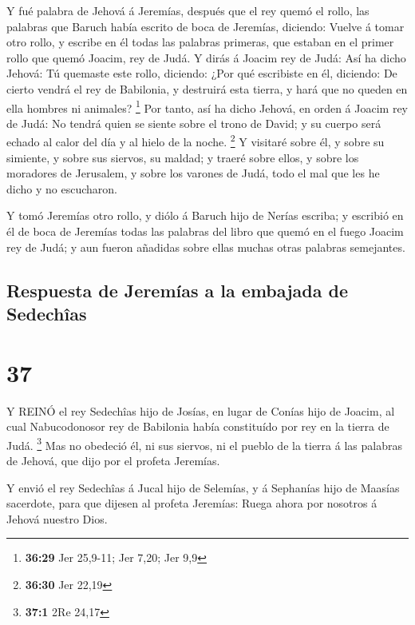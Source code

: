  Y fué palabra de Jehová á Jeremías, después que el rey
quemó el rollo, las palabras que Baruch había escrito de boca de
Jeremías, diciendo:  Vuelve á tomar otro rollo, y escribe
en él todas las palabras primeras, que estaban en el primer rollo que
quemó Joacim, rey de Judá.  Y dirás á Joacim rey de Judá:
Así ha dicho Jehová: Tú quemaste este rollo, diciendo: ¿Por qué
escribiste en él, diciendo: De cierto vendrá el rey de Babilonia, y
destruirá esta tierra, y hará que no queden en ella hombres ni animales?
\footnote{\textbf{36:29} Jer 25,9-11; Jer 7,20; Jer 9,9} 
Por tanto, así ha dicho Jehová, en orden á Joacim rey de Judá: No tendrá
quien se siente sobre el trono de David; y su cuerpo será echado al
calor del día y al hielo de la noche. \footnote{\textbf{36:30} Jer 22,19}
 Y visitaré sobre él, y sobre su simiente, y sobre sus
siervos, su maldad; y traeré sobre ellos, y sobre los moradores de
Jerusalem, y sobre los varones de Judá, todo el mal que les he dicho y
no escucharon.

 Y tomó Jeremías otro rollo, y diólo á Baruch hijo de
Nerías escriba; y escribió en él de boca de Jeremías todas las palabras
del libro que quemó en el fuego Joacim rey de Judá; y aun fueron
añadidas sobre ellas muchas otras palabras semejantes.

\hypertarget{respuesta-de-jeremuxedas-a-la-embajada-de-sedechuxeeas}{%
\subsection{Respuesta de Jeremías a la embajada de
Sedechîas}\label{respuesta-de-jeremuxedas-a-la-embajada-de-sedechuxeeas}}

\hypertarget{section-36}{%
\section{37}\label{section-36}}

 Y REINÓ el rey Sedechîas hijo de Josías, en lugar de Conías
hijo de Joacim, al cual Nabucodonosor rey de Babilonia había constituído
por rey en la tierra de Judá. \footnote{\textbf{37:1} 2Re 24,17}
 Mas no obedeció él, ni sus siervos, ni el pueblo de la
tierra á las palabras de Jehová, que dijo por el profeta Jeremías.

 Y envió el rey Sedechîas á Jucal hijo de Selemías, y á
Sephanías hijo de Maasías sacerdote, para que dijesen al profeta
Jeremías: Ruega ahora por nosotros á Jehová nuestro Dios.

